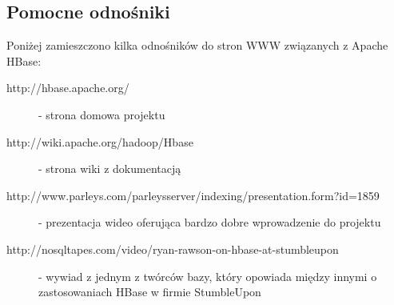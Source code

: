 \subsection*{Pomocne odnośniki}

Poniżej zamieszczono kilka odnośników do stron WWW związanych z Apache HBase:

\begin{description}
 \item [http://hbase.apache.org/] - strona domowa projektu
 \item [http://wiki.apache.org/hadoop/Hbase] - strona wiki z dokumentacją
 \item [http://www.parleys.com/parleysserver/indexing/presentation.form?id=1859] - prezentacja wideo oferująca bardzo dobre wprowadzenie do projektu
 \item [http://nosqltapes.com/video/ryan-rawson-on-hbase-at-stumbleupon] - wywiad z jednym z twórców bazy, który opowiada między innymi o zastosowaniach HBase w firmie StumbleUpon
\end{description}
